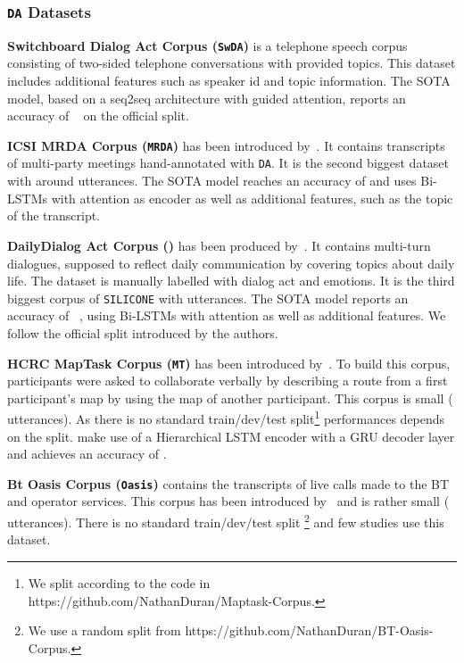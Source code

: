 \documentclass[11pt,a4paper]{article}
\begin{document}
\subsubsection{\texttt{DA} Datasets}

\noindent\textbf{Switchboard Dialog Act Corpus (\texttt{SwDA})} is a telephone speech corpus consisting  of two-sided telephone conversations with provided topics. This dataset includes additional features such as speaker id and topic information. The SOTA model, based on a seq2seq architecture with guided attention, reports an accuracy of ~\cite{colombo2020guiding} on the official split.

\noindent\textbf{ICSI MRDA Corpus (\texttt{MRDA})} has been introduced by~\citet{dataset_mrda}. It contains transcripts of multi-party meetings hand-annotated with \texttt{DA}. It is the second biggest dataset with around  utterances. The SOTA model reaches an accuracy of  \cite{sota_swda_1} and uses Bi-LSTMs with attention as encoder as well as additional features, such as the topic of the transcript. 

\noindent\textbf{DailyDialog Act Corpus ({})} has been produced by~\citet{dataset_dailydialog}. It contains multi-turn dialogues, supposed to reflect daily communication by covering topics about daily life. The dataset is manually labelled with dialog act and emotions. It is the third biggest corpus of \texttt{SILICONE} with  utterances. The SOTA model reports an accuracy of ~\cite{sota_swda_1}, using Bi-LSTMs with attention as well as additional features.
We follow the official split introduced by the authors.

\noindent\textbf{HCRC MapTask Corpus (\texttt{MT})} has been introduced by~\cite{dataset_maptask}. To build this corpus, participants were asked to collaborate verbally by describing a route from a first participant’s map by using the map of another participant. This corpus is small ( utterances). As there is no standard train/dev/test split\footnote{We split according to the code in https://github.com/NathanDuran/Maptask-Corpus.} performances depends on the split. \citet{tran2017generative} make use of a Hierarchical LSTM encoder with a GRU decoder layer and achieves an accuracy of .

\noindent\textbf{Bt Oasis Corpus (\texttt{Oasis})} contains the transcripts of live calls made to the BT and operator services. This corpus has been introduced by~\cite{dataset_gtoasis} and is rather small ( utterances). There is no standard train/dev/test split \footnote{We use a random split from https://github.com/NathanDuran/BT-Oasis-Corpus.} and few studies use this dataset. 
\end{document}
